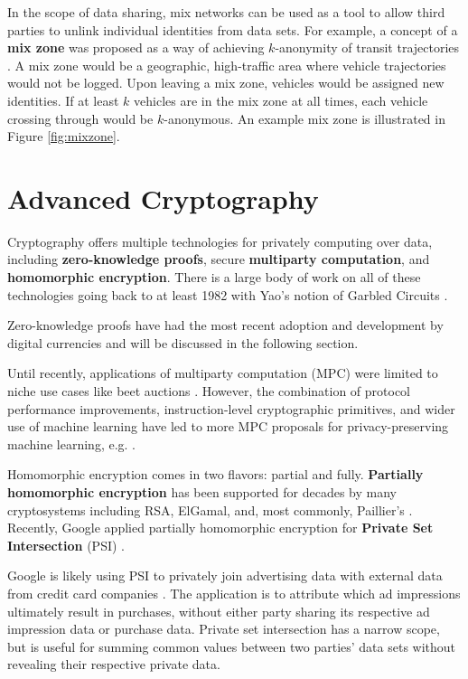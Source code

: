 \documentclass[nobib]{tufte-handout}
\begin{document}
In the scope of data sharing, mix networks can be used as a tool to allow third
parties to unlink individual identities from data sets. For example, a
concept of a \textbf{mix zone} was proposed as a way of achieving $k$-anonymity of
transit trajectories \cite{freudiger2007mix}. A mix zone would be a geographic,
high-traffic area where vehicle trajectories would not be logged. Upon leaving
a mix zone, vehicles would be assigned new identities. If at least $k$ vehicles
are in the mix zone at all times, each vehicle crossing through would be
$k$-anonymous. An example mix zone is illustrated in Figure \ref{fig:mixzone}.

\section{Advanced Cryptography}

Cryptography offers multiple technologies for privately computing over data,
including \textbf{zero-knowledge proofs}, secure \textbf{multiparty
computation}, and \textbf{homomorphic encryption}. There is a large body of work
on all of these technologies going back to at least 1982 with Yao's notion of
Garbled Circuits \cite{DBLP:conf/focs/Yao82b}.

Zero-knowledge proofs have had the most recent adoption and development by
digital currencies and will be discussed in the following section.

Until recently, applications of multiparty computation (MPC) were limited to
niche use cases like beet auctions \cite{DBLP:conf/fc/BogetoftCDGJKNNNPST09}.
However, the combination of protocol performance improvements, instruction-level
cryptographic primitives, and wider use of machine learning have led to
more MPC proposals for privacy-preserving machine learning, e.g.
\cite{DBLP:conf/ccs/BonawitzIKMMPRS17}.

Homomorphic encryption comes in two flavors: partial and fully.
\textbf{Partially homomorphic encryption} has been supported for decades by many
cryptosystems including RSA, ElGamal, and, most commonly, Paillier's
\cite{DBLP:conf/eurocrypt/Paillier99}. Recently, Google applied partially
homomorphic encryption for \textbf{Private Set Intersection} (PSI)
\cite{google-psi}.

Google is likely using PSI to privately join advertising data with external data
from credit card companies \cite{google-mastercard}. The application is to
attribute which ad impressions ultimately result in purchases, without either
party sharing its respective ad impression data or purchase data. Private set
intersection has a narrow scope, but is useful for summing common values between
two parties’ data sets without revealing their respective private data.
\end{document}
